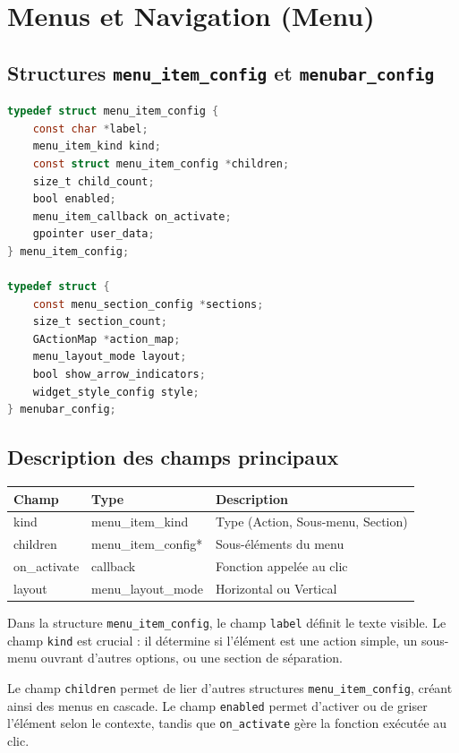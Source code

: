 \section{Menus et Navigation (Menu)}

\subsection{Structures \texttt{menu\_item\_config} et \texttt{menubar\_config}}
\begin{lstlisting}[language=C]
typedef struct menu_item_config {
    const char *label;
    menu_item_kind kind;
    const struct menu_item_config *children;
    size_t child_count;
    bool enabled;
    menu_item_callback on_activate;
    gpointer user_data;
} menu_item_config;

typedef struct {
    const menu_section_config *sections;
    size_t section_count;
    GActionMap *action_map;
    menu_layout_mode layout;
    bool show_arrow_indicators;
    widget_style_config style;
} menubar_config;
\end{lstlisting}

\subsection{Description des champs principaux}
\begin{center}
\begin{tabular}{|l|l|p{5cm}|}
\hline
\textbf{Champ} & \textbf{Type} & \textbf{Description} \\
\hline
kind & menu\_item\_kind & Type (Action, Sous-menu, Section) \\
\hline
children & menu\_item\_config* & Sous-éléments du menu \\
\hline
on\_activate & callback & Fonction appelée au clic \\
\hline
layout & menu\_layout\_mode & Horizontal ou Vertical \\
\hline
\end{tabular}
\end{center}

\bigskip

Dans la structure \texttt{menu\_item\_config}, le champ \texttt{label} définit le texte visible. Le champ \texttt{kind} est crucial : il détermine si l'élément est une action simple, un sous-menu ouvrant d'autres options, ou une section de séparation. 

Le champ \texttt{children} permet de lier d'autres structures \texttt{menu\_item\_config}, créant ainsi des menus en cascade. Le champ \texttt{enabled} permet d'activer ou de griser l'élément selon le contexte, tandis que \texttt{on\_activate} gère la fonction exécutée au clic.

